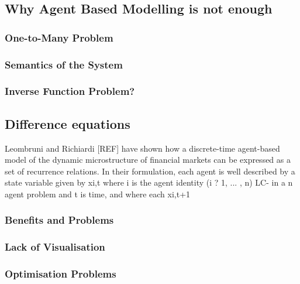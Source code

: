 \documentclass{article}
\begin{document}

\subsection{Why Agent Based Modelling is not enough}
%


\subsubsection{One-to-Many Problem}
\subsubsection{Semantics of the System} 
\subsubsection{Inverse Function Problem?} 

\subsection{Difference equations} 

Leombruni and Richiardi [REF] have shown how a discrete-time agent-based model of the dynamic microstructure of financial markets can be expressed as a set of recurrence relations.  In their formulation, each agent is well described by a state variable given by xi,t where i is the agent identity (i ? 1, ... , n) LC- in a n agent problem and t is time, and where each xi,t+1  

 \subsubsection{Benefits and Problems} 
 
 \subsubsection{Lack of Visualisation} 

\subsubsection{Optimisation Problems} 
\end{document}
